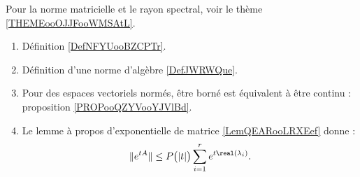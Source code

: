 
         \label{THEMEooHSLLooBQpFAr}
    Pour la norme matricielle et le rayon spectral, voir le thème \ref{THEMEooOJJFooWMSAtL}.
    \begin{enumerate}
        \item
            Définition \ref{DefNFYUooBZCPTr}.
        \item 
            Définition d'une norme d'algèbre \ref{DefJWRWQue}.
        \item
            Pour des espaces vectoriels normés, être borné est équivalent à être continu : proposition \ref{PROPooQZYVooYJVlBd}.
        \item
            Le lemme à propos d'exponentielle de matrice \ref{LemQEARooLRXEef} donne :
            \begin{equation}
                \|  e^{tA} \|\leq P\big( | t | \big)\sum_{i=1}^r e^{t\real(\lambda_i)}.
            \end{equation}
    \end{enumerate}

